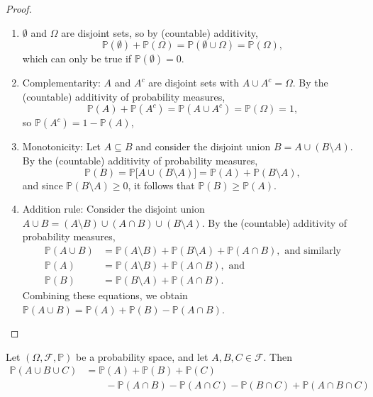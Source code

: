 \documentclass[lecture]{csm}
\newcommand{\prob}{\mathbb{P}}
\def\it{\item}
\def\ben{\begin{enumerate}}
\def\een{\end{enumerate}}
\begin{document}
\begin{proof}
\ben

\it %
$\emptyset$ and $\Omega$ are disjoint sets, so by (countable) additivity,
\[
\prob(\emptyset) + \prob(\Omega) = \prob(\emptyset\cup\Omega) = \prob(\Omega),
\]
which can only be true if $\prob(\emptyset) = 0$.

\newpage

\it %
Complementarity: $A$ and $A^c$ are disjoint sets with $A\cup A^c =\Omega$. By the (countable) additivity of probability measures,
\[
\prob(A) + \prob(A^c) = \prob(A\cup A^c) = \prob(\Omega) = 1,
\]
so $\prob(A^c) = 1 - \prob(A)$,

\it %
Monotonicity: Let $A\subseteq B$ and consider the disjoint union $B = A\cup (B\setminus A)$. By the (countable) additivity of probability measures,
\[
\prob(B) = \prob\big[A\cup (B\setminus A)\big] = \prob(A) + \prob(B\setminus A),
\]
and since $\prob(B\setminus A)\geq 0$, it follows that $\prob(B) \geq \prob(A)$.

\it %
Addition rule: Consider the disjoint union $A\cup B = (A\setminus B) \cup (A\cap B) \cup (B\setminus A)$. By the (countable) additivity of probability measures,
\begin{align*}
\prob(A\cup B) 	& = \prob(A\setminus B) + \prob(B\setminus A) + \prob(A\cap B), \text{\ and similarly} \\
\prob(A) 		& = \prob(A\setminus B) + \prob(A\cap B), \text{\ and} \\
\prob(B)	 		& = \prob(B\setminus A) + \prob(A\cap B).
\end{align*}
Combining these equations, we obtain $\prob(A\cup B) = \prob(A) + \prob(B) - \prob(A\cap B)$.

\een
\end{proof}

\newpage %

\newpage

\begin{theorem}\label{thm:inclusion-exclusion}
Let $(\Omega,\mathcal{F},\prob)$ be a probability space, and let $A,B,C\in\mathcal{F}$. Then
\begin{align*}
\prob(A\cup B\cup C) 
	& = \prob(A) + \prob(B) + \prob(C) \\
	& \qquad - \prob(A\cap B) - \prob(A\cap C) - \prob(B\cap C) + \prob(A\cap B\cap C)
\end{align*}
\end{theorem}
\end{document}
